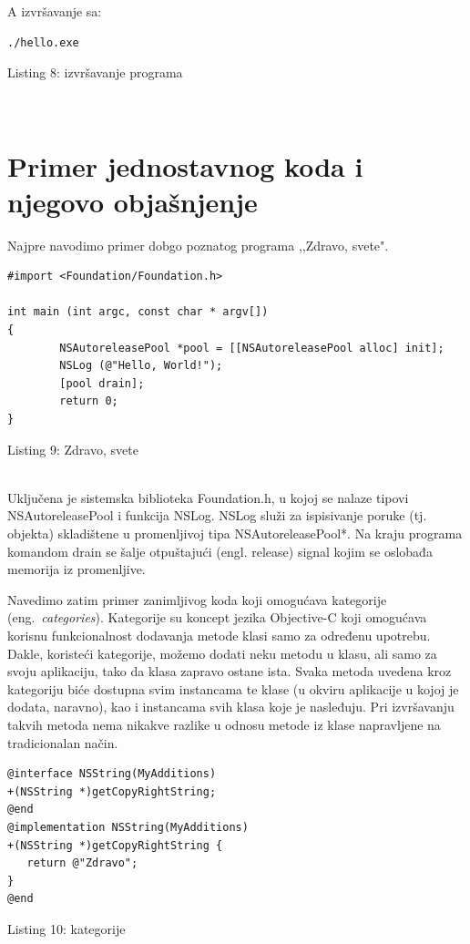 \documentclass[a4paper]{article}
\begin{document}
{{A izvršavanje sa:
\begin{lstlisting}[frame=single]
./hello.exe
\end{lstlisting}
\caption{Listing 8: izvršavanje programa} \\

\section{Primer jednostavnog koda i njegovo objašnjenje}
\label{sec:primer}
Najpre navodimo primer dobgo poznatog programa ,,Zdravo, svete".

\begin{lstlisting}
#import <Foundation/Foundation.h>
 
int main (int argc, const char * argv[])
{
        NSAutoreleasePool *pool = [[NSAutoreleasePool alloc] init];
        NSLog (@"Hello, World!");
        [pool drain];
        return 0;
}

\end{lstlisting}
\caption{Listing 9: Zdravo, svete} \\

Uključena je sistemska biblioteka Foundation.h, u kojoj se nalaze tipovi NSAutoreleasePool i funkcija NSLog. NSLog služi za ispisivanje poruke (tj. objekta) skladištene u promenljivoj tipa NSAutoreleasePool*. Na kraju programa komandom drain se šalje otpuštajući (engl. release) signal kojim se oslobađa memorija iz promenljive.

Navedimo zatim primer zanimljivog koda \cite{tutorijali} koji omogućava kategorije (eng.~{\em categories}). Kategorije su koncept jezika Objective-C koji omogućava korisnu funkcionalnost dodavanja metode klasi samo za određenu upotrebu. Dakle, koristeći kategorije, možemo dodati neku metodu u klasu, ali samo za svoju aplikaciju, tako da klasa zapravo ostane ista. Svaka metoda uvedena kroz kategoriju biće dostupna svim instancama te klase (u okviru aplikacije u kojoj je dodata, naravno), kao i instancama svih klasa koje je nasleđuju. Pri izvršavanju takvih metoda nema nikakve razlike u odnosu metode iz klase napravljene na tradicionalan način.
\begin{lstlisting}[frame=single]
@interface NSString(MyAdditions)
+(NSString *)getCopyRightString;
@end
@implementation NSString(MyAdditions)
+(NSString *)getCopyRightString {
   return @"Zdravo";
}
@end
\end{lstlisting}
\caption{Listing 10: kategorije} \\

}}
\end{document}
